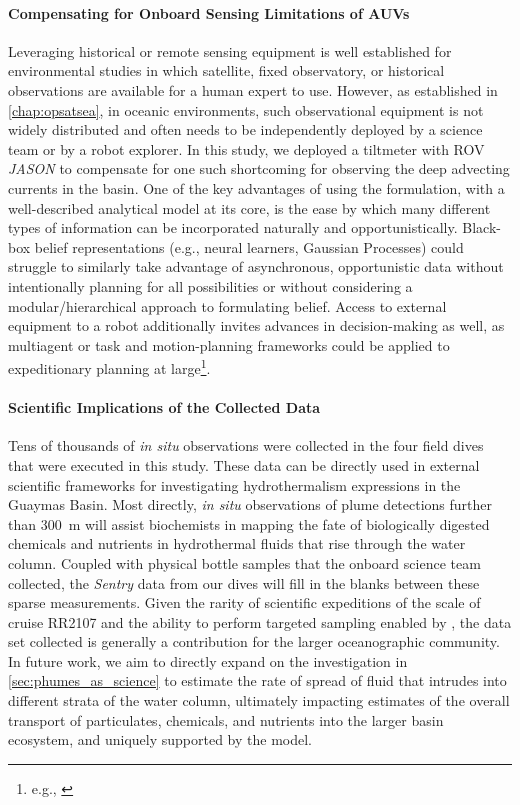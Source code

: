 \paragraph{Compensating for Onboard Sensing Limitations of AUVs}
Leveraging historical or remote sensing equipment is well established for environmental studies in which satellite, fixed observatory, or historical observations are available for a human expert to use. However, as established in \cref{chap:opsatsea}, in oceanic environments, such observational equipment is not widely distributed and often needs to be independently deployed by a science team or by a robot explorer. In this study, we deployed a tiltmeter with ROV \emph{JASON} to compensate for one such shortcoming for observing the deep advecting currents in the basin. One of the key advantages of using the \PHUMES formulation, with a well-described analytical model at its core, is the ease by which many different types of information can be incorporated naturally and opportunistically. Black-box belief representations (e.g., neural learners, Gaussian Processes) could struggle to similarly take advantage of asynchronous, opportunistic data without intentionally planning for all possibilities or without considering a modular/hierarchical approach to formulating belief. Access to external equipment to a robot additionally invites advances in decision-making as well, as multiagent\autocite{salam2019adaptive,li2014multi,luo2018adaptive,ouyang2014multi} or task and motion-planning frameworks could be applied to expeditionary planning at large\footnote{e.g., \autocite{timmons2019automated}}. 

\paragraph{Scientific Implications of the Collected Data}
Tens of thousands of \emph{in situ} observations were collected in the four field dives that were executed in this study. These data can be directly used in external scientific frameworks for investigating hydrothermalism expressions in the Guaymas Basin. Most directly, \emph{in situ} observations of plume detections further than \SI{300}{\meter} will assist biochemists in mapping the fate of biologically digested chemicals and nutrients in hydrothermal fluids that rise through the water column. Coupled with physical bottle samples that the onboard science team collected, the \emph{Sentry} data from our dives will fill in the blanks between these sparse measurements. Given the rarity of scientific expeditions of the scale of cruise RR2107 and the ability to perform targeted sampling enabled by \PHORTEX, the data set collected is generally a contribution for the larger oceanographic community. In future work, we aim to directly expand on the investigation in \cref{sec:phumes_as_science} to estimate the rate of spread of fluid that intrudes into different strata of the water column, ultimately impacting estimates of the overall transport of particulates, chemicals, and nutrients into the larger basin ecosystem, and uniquely supported by the \PHUMES model.

